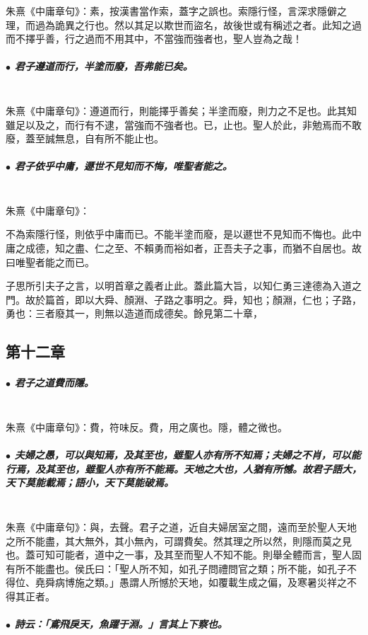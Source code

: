 \documentclass[hyperref, UTF8, 12pt, a4paper]{ctexrep}
\begin{document}
朱熹《中庸章句》：素，按漢書當作索，蓋字之誤也。索隱行怪，言深求隱僻之理，而過為詭異之行也。然以其足以欺世而盜名，故後世或有稱述之者。此知之過而不擇乎善，行之過而不用其中，不當強而強者也，聖人豈為之哉！

\subparagraph{$\bullet$ 君子遵道而行，半塗而廢，吾弗能已矣。} ~\\

朱熹《中庸章句》：遵道而行，則能擇乎善矣；半塗而廢，則力之不足也。此其知雖足以及之，而行有不逮，當強而不強者也。已，止也。聖人於此，非勉焉而不敢廢，蓋至誠無息，自有所不能止也。

\subparagraph{$\bullet$ 君子依乎中庸，遯世不見知而不悔，唯聖者能之。} ~\\

朱熹《中庸章句》：

\begin{adjustwidth}{2cm}{1cm}
\indent\indent 不為索隱行怪，則依乎中庸而已。不能半塗而廢，是以遯世不見知而不悔也。此中庸之成德，知之盡、仁之至、不賴勇而裕如者，正吾夫子之事，而猶不自居也。故曰唯聖者能之而已。

子思所引夫子之言，以明首章之義者止此。蓋此篇大旨，以知仁勇三達德為入道之門。故於篇首，即以大舜、顏淵、子路之事明之。舜，知也；顏淵，仁也；子路，勇也：三者廢其一，則無以造道而成德矣。餘見第二十章，
\end{adjustwidth}

\newpage
\subsection{第十二章}

\subparagraph{$\bullet$ 君子之道費而隱。} ~\\

朱熹《中庸章句》：費，符味反。費，用之廣也。隱，體之微也。

\subparagraph{$\bullet$ 夫婦之愚，可以與知焉，及其至也，雖聖人亦有所不知焉；夫婦之不肖，可以能行焉，及其至也，雖聖人亦有所不能焉。天地之大也，人猶有所憾。故君子語大，天下莫能載焉；語小，天下莫能破焉。} ~\\

朱熹《中庸章句》：與，去聲。君子之道，近自夫婦居室之間，遠而至於聖人天地之所不能盡，其大無外，其小無內，可謂費矣。然其理之所以然，則隱而莫之見也。蓋可知可能者，道中之一事，及其至而聖人不知不能。則舉全體而言，聖人固有所不能盡也。侯氏曰：「聖人所不知，如孔子問禮問官之類；所不能，如孔子不得位、堯舜病博施之類。」愚謂人所憾於天地，如覆載生成之偏，及寒暑災祥之不得其正者。

\subparagraph{$\bullet$ 詩云：「鳶飛戾天，魚躍于淵。」言其上下察也。} ~\\
\end{document}
